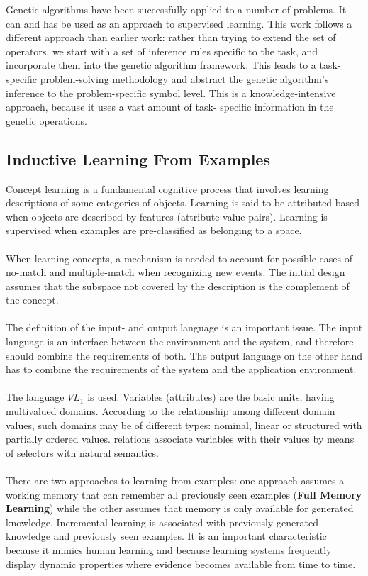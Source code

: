\documentclass[../main.tex]{subfiles}
\begin{document}
Genetic algorithms have been successfully applied to a number of problems. It can and has be used as an approach to
supervised learning. This work follows a different approach than earlier work: rather than trying to extend the set of
operators, we start with a set of inference rules specific to the task, and incorporate them into the genetic algorithm
framework. This leads to a  task-specific problem-solving methodology and abstract the genetic algorithm's inference to
the problem-specific symbol level. This is a knowledge-intensive approach, because it uses a vast amount of task-
specific information in the genetic operations.

\subsection{Inductive Learning From Examples}
Concept learning is a fundamental cognitive process that involves learning descriptions
of some categories of objects.  Learning is said to be attributed-based when objects are described by features
(attribute-value pairs). Learning is supervised when examples are pre-classified as belonging to a space.
\\\\
When learning concepts, a mechanism is needed to account for possible cases of no-match and multiple-match when
recognizing new events. The initial design assumes that the subspace not covered by the description is the complement
of the concept.
\\\\
The definition of the input- and output language is an important issue. The input language is an interface between the
environment and the system, and therefore should combine the requirements of both. The output language on the other
hand has to combine the requirements of the system and the application environment.
\\\\
The language $VL_1$ is used. Variables (attributes) are the basic units, having multivalued domains. According to the
relationship among different domain values, such domains may be of different types: nominal, linear or structured with
partially ordered values. relations associate variables with their values by means of selectors with natural semantics.
\\\\
There are two approaches to learning from examples: one approach assumes a working memory that can remember all
previously seen examples (\textbf{Full Memory Learning}) while the other assumes that memory is only available for
generated knowledge. Incremental learning is associated with previously generated knowledge and previously seen
examples. It is an important characteristic because it mimics human learning and because learning systems frequently
display dynamic properties where evidence becomes available from time to time.
\end{document}
